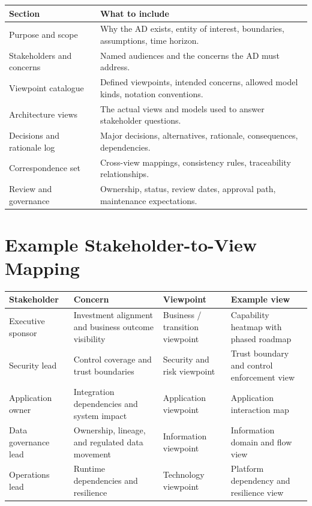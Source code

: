 \documentclass[11pt]{article}
\begin{document}
\begin{center}
\renewcommand{\arraystretch}{1.2}
\begin{tabularx}{\textwidth}{>{\raggedright\arraybackslash}p{} X}
\toprule
\textbf{Section} & \textbf{What to include} \\
\midrule
Purpose and scope & Why the AD exists, entity of interest, boundaries, assumptions, time horizon. \\
Stakeholders and concerns & Named audiences and the concerns the AD must address. \\
Viewpoint catalogue & Defined viewpoints, intended concerns, allowed model kinds, notation conventions. \\
Architecture views & The actual views and models used to answer stakeholder questions. \\
Decisions and rationale log & Major decisions, alternatives, rationale, consequences, dependencies. \\
Correspondence set & Cross-view mappings, consistency rules, traceability relationships. \\
Review and governance & Ownership, status, review dates, approval path, maintenance expectations. \\
\bottomrule
\end{tabularx}
\end{center}

\section*{Example Stakeholder-to-View Mapping}
\begin{center}
\renewcommand{\arraystretch}{1.2}
\begin{tabularx}{\textwidth}{>{\raggedright\arraybackslash}p{} >{\raggedright\arraybackslash}p{} >{\raggedright\arraybackslash}p{} X}
\toprule
\textbf{Stakeholder} & \textbf{Concern} & \textbf{Viewpoint} & \textbf{Example view} \\
\midrule
Executive sponsor & Investment alignment and business outcome visibility & Business / transition viewpoint & Capability heatmap with phased roadmap \\
Security lead & Control coverage and trust boundaries & Security and risk viewpoint & Trust boundary and control enforcement view \\
Application owner & Integration dependencies and system impact & Application viewpoint & Application interaction map \\
Data governance lead & Ownership, lineage, and regulated data movement & Information viewpoint & Information domain and flow view \\
Operations lead & Runtime dependencies and resilience & Technology viewpoint & Platform dependency and resilience view \\
\bottomrule
\end{tabularx}
\end{center}
\end{document}
